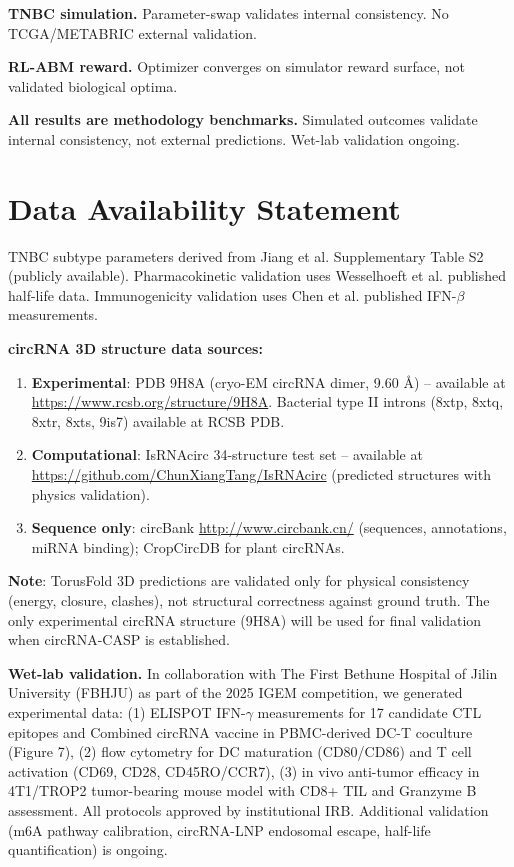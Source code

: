 \documentclass[11pt,a4paper]{article}
\begin{document}
\textbf{TNBC simulation.} Parameter-swap validates internal consistency. No TCGA/METABRIC external validation.

\textbf{RL-ABM reward.} Optimizer converges on simulator reward surface, not validated biological optima.

\textbf{All results are methodology benchmarks.} Simulated outcomes validate internal consistency, not external predictions. Wet-lab validation ongoing.

\section{Data Availability Statement}

TNBC subtype parameters derived from Jiang et al. \citep{jiang2019} Supplementary Table S2 (publicly available). Pharmacokinetic validation uses Wesselhoeft et al. \citep{wesselhoeft2018} published half-life data. Immunogenicity validation uses Chen et al. \citep{chen2019} published IFN-$\beta$ measurements.

\textbf{circRNA 3D structure data sources:}
\begin{enumerate}
\item \textbf{Experimental}: PDB 9H8A (cryo-EM circRNA dimer, 9.60 Å) -- available at \url{https://www.rcsb.org/structure/9H8A}. Bacterial type II introns (8xtp, 8xtq, 8xtr, 8xts, 9is7) available at RCSB PDB.
\item \textbf{Computational}: IsRNAcirc 34-structure test set -- available at \url{https://github.com/ChunXiangTang/IsRNAcirc} (predicted structures with physics validation).
\item \textbf{Sequence only}: circBank \url{http://www.circbank.cn/} (sequences, annotations, miRNA binding); CropCircDB for plant circRNAs.
\end{enumerate}

\textbf{Note}: TorusFold 3D predictions are validated only for physical consistency (energy, closure, clashes), not structural correctness against ground truth. The only experimental circRNA structure (9H8A) will be used for final validation when circRNA-CASP is established.

\textbf{Wet-lab validation.} In collaboration with The First Bethune Hospital of Jilin University (FBHJU) as part of the 2025 IGEM competition, we generated experimental data: (1) ELISPOT IFN-$\gamma$ measurements for 17 candidate CTL epitopes and Combined circRNA vaccine in PBMC-derived DC-T coculture (Figure 7), (2) flow cytometry for DC maturation (CD80/CD86) and T cell activation (CD69, CD28, CD45RO/CCR7), (3) in vivo anti-tumor efficacy in 4T1/TROP2 tumor-bearing mouse model with CD8+ TIL and Granzyme B assessment. All protocols approved by institutional IRB. Additional validation (m6A pathway calibration, circRNA-LNP endosomal escape, half-life quantification) is ongoing.
\end{document}
